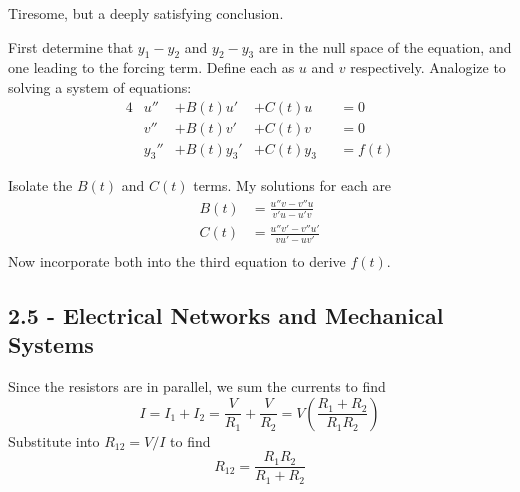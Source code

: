 \documentclass[a4paper]{article}
\begin{document}
Tiresome, but a deeply satisfying conclusion.

\vspace{12pt}


First determine that \( y_{1} - y_{2} \) and \( y_{2} - y_{3} \) are in the null space of the equation, and one leading to the forcing term. Define each as \( u  \) and \( v  \) respectively. Analogize to solving a system of equations:
\begin{alignat*}{4}
	& u'' & + B \!\left( t  \right) u' & + C \!\left( t  \right) u && = 0 \\[6pt]
	& v'' & + B \!\left( t  \right) v' & + C \!\left( t  \right) v && = 0 \\[6pt]
	& y_{3}'' & + B \!\left( t  \right) y_{3}' & + C \!\left( t  \right) y_{3} && = f \!\left( t \right) 
\end{alignat*}

Isolate the \( B \!\left( t  \right) \) and \( C \!\left( t  \right) \) terms. My solutions for each are
\begin{align*}
	B \!\left( t  \right) & = \frac{u''v - v''u }{v'u - u'v} \\[12pt]
	C \!\left( t \right) & = \frac{u''v' - v''u'}{vu' - uv'} \\ 
\end{align*}
Now incorporate both into the third equation to derive \( f \!\left( t  \right) \).

\newpage
\subsection{\textsf{2.5 - Electrical Networks and Mechanical Systems}}


Since the resistors are in parallel, we sum the currents to find
\[
	I = I_{1} + I_{2} = \frac{V }{R_{1}} + \frac{V }{R_{2}} = V \!\left( \frac{R_{1} + R_{2}}{R_{1}R_{2}} \right) 
\]
Substitute into \( R_{12} = V / I  \) to find
\[
	R_{12} = \frac{R_{1}R_{2}}{R_{1} + R_{2}} 
\]
\end{document}
